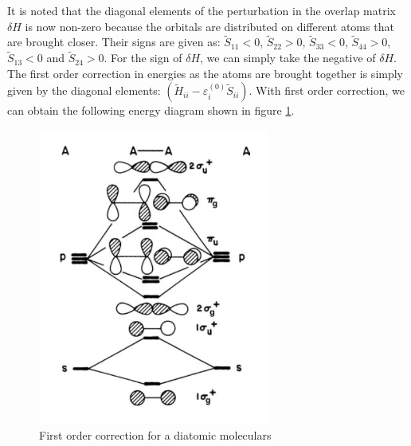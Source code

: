 \documentclass{article}
\newcommand{\order}[2]{#1^{(#2)}}
\begin{document}
It is noted that the diagonal elements of the perturbation in the overlap matrix 
$\delta H$ is now non-zero because the orbitals are distributed on different atoms 
that are brought closer. Their signs are given as:
$\tilde{S}_{11} < 0$, 
$\tilde{S}_{22} > 0$, 
$\tilde{S}_{33} < 0$, 
$\tilde{S}_{44} > 0$, 
$\tilde{S}_{13} < 0$ and 
$\tilde{S}_{24} > 0$. For the sign of $\delta H$, we can simply take the negative 
of $\delta H$. The first order correction in energies as the atoms are brought together 
is simply given by the diagonal elements: 
$(\tilde{H}_{ii} - \order{\varepsilon_i}{0} \tilde{S}_{ii})$. With first order correction, 
we can obtain the following energy diagram shown in figure \ref{F:A2_first_order}.
\begin{figure}[h!]
    \centering
    \includegraphics[width=3in]{F_A2_first_order.png}
    \caption{First order correction for a diatomic moleculars}
    \label{F:A2_first_order}
\end{figure}
\end{document}

